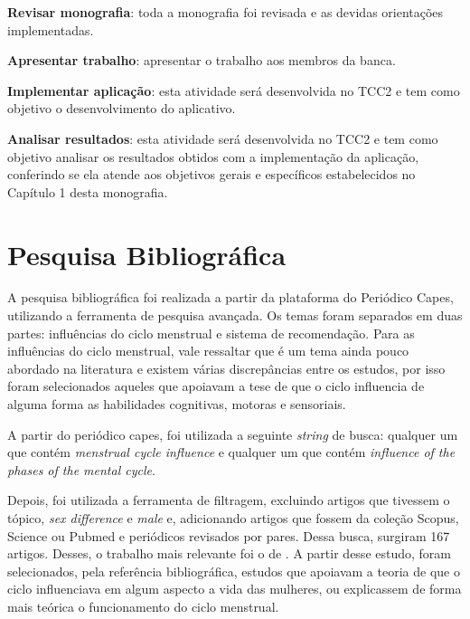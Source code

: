 \textbf{Revisar monografia}: toda a monografia foi revisada e as devidas orientações implementadas.
 
\textbf{Apresentar trabalho}: apresentar o trabalho aos membros da banca.

\textbf{Implementar aplicação}: esta atividade será desenvolvida no TCC2 e tem como objetivo 
o desenvolvimento do aplicativo.

\textbf{Analisar resultados}: esta atividade será desenvolvida no TCC2 e tem como objetivo 
analisar os resultados obtidos com a implementação da aplicação, conferindo se ela atende 
aos objetivos gerais e específicos estabelecidos no Capítulo 1 desta monografia.

\section{Pesquisa Bibliográfica}

A pesquisa bibliográfica foi realizada a partir da plataforma do Periódico Capes, utilizando a ferramenta de pesquisa avançada.
Os temas foram separados em duas partes: influências do ciclo menstrual e sistema de recomendação.
Para as influências do ciclo menstrual, vale ressaltar que é um tema ainda pouco abordado na literatura e existem 
várias discrepâncias entre os estudos, por isso foram selecionados aqueles que apoiavam a tese de que 
o ciclo influencia de alguma forma as habilidades cognitivas, motoras e sensoriais. 




A partir do periódico capes, foi utilizada a seguinte \emph{string} de busca:
qualquer um que contém \emph{menstrual cycle influence} e qualquer um que contém 
\emph{influence of the phases of the mental cycle}. 

Depois, foi utilizada a ferramenta de filtragem, excluindo artigos que tivessem o tópico, \emph{sex difference} e \emph{male}
 e, adicionando artigos que fossem da coleção Scopus, Science ou Pubmed e periódicos revisados por pares. Dessa busca, surgiram 167 artigos.
Desses, o trabalho mais relevante foi o de . A partir desse estudo, foram selecionados, pela referência bibliográfica, estudos que apoiavam 
a teoria de que o ciclo influenciava em algum aspecto a vida das mulheres, ou explicassem de forma mais teórica o funcionamento do ciclo menstrual.


